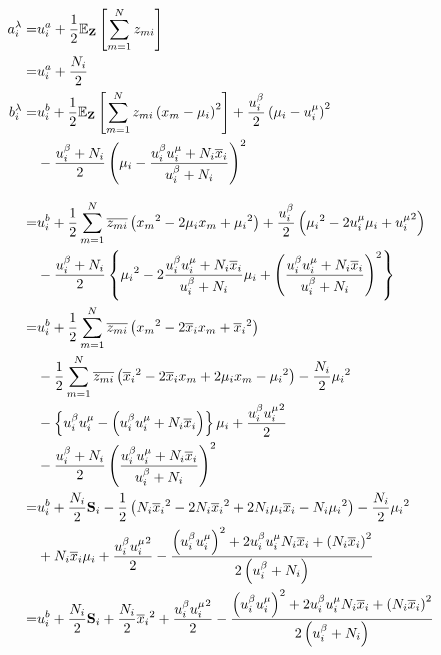 \begin{align}
  a_i^\lambda  =&  u_i^a + \frac{1}{2} \mathbb{E}_{\bf Z}\left[ \sum_{m=1}^N z_{mi} \right]  \\
  =&  u_i^a + \frac{N_i}{2}  \\
  b_i^\lambda  =&  u_i^b + \frac{1}{2} \mathbb{E}_{\bf Z}\left[ \sum_{m=1}^N z_{mi} \left( {x_m} - \mu_i \right)^2 \right]  
      + \frac{u_i^\beta}{2} \left( \mu_i - u_i^\mu \right)^2  \notag  \\  
    &  - \frac{u_i^\beta + N_i}{2} \left( \mu_i - \frac{u_i^\beta u_i^\mu + N_i \overline{x}_i}{u_i^\beta + N_i} \right)^2  \\
%
\intertext{}
%
  =&  u_i^b + \frac{1}{2} \sum_{m=1}^N \overline{z_{mi}} \left( {x_m}^2 - 2 \mu_i x_m + {\mu_i}^2 \right)  + \frac{u_i^\beta}{2} \left( {\mu_i}^2 - 2 u_i^\mu \mu_i + {u_i^\mu}^2 \right)  \notag  \\
    &  - \frac{u_i^\beta + N_i}{2} \left\{ {\mu_i}^2 - 2 \frac{u_i^\beta u_i^\mu + N_i \overline{x}_i}{u_i^\beta + N_i} \mu_i + \left( \frac{u_i^\beta u_i^\mu + N_i \overline{x}_i}{u_i^\beta + N_i} \right)^2 \right\}  \\
%
  =&  u_i^b + \frac{1}{2} \sum_{m=1}^N \overline{z_{mi}} \left( {x_m}^2 - 2 \overline{x}_i x_m + {\overline{x}_i}^2 \right)  \notag  \\  
    &  - \frac{1}{2} \sum_{m=1}^N \overline{z_{mi}} \left( {\overline{x}_i}^2 - 2 \overline{x}_i x_m + 2 \mu_i x_m - {\mu_i}^2 \right)  - \frac{N_i}{2} {\mu_i}^2  \notag  \\
  &  - \left\{ u_i^\beta u_i^\mu - \left( u_i^\beta u_i^\mu + N_i \overline{x}_i \right) \right\} \mu_i  %
    +  \frac{u_i^\beta {u_i^\mu}^2}{2}  \notag  \\  
  &  - \frac{u_i^\beta + N_i}{2} \left( \frac{u_i^\beta u_i^\mu + N_i \overline{x}_i}{u_i^\beta + N_i} \right)^2  \\
%
  =&  u_i^b + \frac{N_i}{2} {\bf S}_i  - \frac{1}{2} \left( N_i {\overline{x}_i}^2 - 2 N_i {\overline{x}_i}^2 + 2 N_i \mu_i \overline{x}_i - N_i {\mu_i}^2 \right)  
    - \frac{N_i}{2} {\mu_i}^2  \notag  \\
    &  + N_i \overline{x}_i \mu_i  +  \frac{u_i^\beta {u_i^\mu}^2}{2} - \frac{ \left( u_i^\beta u_i^\mu \right)^2 + 2 u_i^\beta u_i^\mu N_i \overline{x}_i + \left( N_i \overline{x}_i \right)^2}{2 \left( u_i^\beta + N_i \right) }  \\
%
  =&  u_i^b + \frac{N_i}{2} {\bf S}_i  + \frac{N_i}{2} {\overline{x}_i}^2  +  \frac{u_i^\beta {u_i^\mu}^2}{2} - \frac{ \left( u_i^\beta u_i^\mu \right)^2 + 2 u_i^\beta u_i^\mu N_i \overline{x}_i + \left( N_i \overline{x}_i \right)^2}{2 \left( u_i^\beta + N_i \right) }  \\

\end{align}

